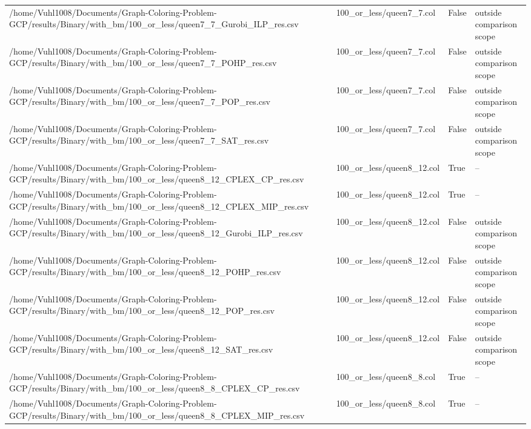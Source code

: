 \begin{table}[htbp]
\begin{tabular}{llll}
/home/Vuhl1008/Documents/Graph-Coloring-Problem-GCP/results/Binary/with\_bm/100\_or\_less/queen7\_7\_Gurobi\_ILP\_res.csv & 100\_or\_less/queen7\_7.col & False & outside comparison scope \\
/home/Vuhl1008/Documents/Graph-Coloring-Problem-GCP/results/Binary/with\_bm/100\_or\_less/queen7\_7\_POHP\_res.csv & 100\_or\_less/queen7\_7.col & False & outside comparison scope \\
/home/Vuhl1008/Documents/Graph-Coloring-Problem-GCP/results/Binary/with\_bm/100\_or\_less/queen7\_7\_POP\_res.csv & 100\_or\_less/queen7\_7.col & False & outside comparison scope \\
/home/Vuhl1008/Documents/Graph-Coloring-Problem-GCP/results/Binary/with\_bm/100\_or\_less/queen7\_7\_SAT\_res.csv & 100\_or\_less/queen7\_7.col & False & outside comparison scope \\
/home/Vuhl1008/Documents/Graph-Coloring-Problem-GCP/results/Binary/with\_bm/100\_or\_less/queen8\_12\_CPLEX\_CP\_res.csv & 100\_or\_less/queen8\_12.col & True & -- \\
/home/Vuhl1008/Documents/Graph-Coloring-Problem-GCP/results/Binary/with\_bm/100\_or\_less/queen8\_12\_CPLEX\_MIP\_res.csv & 100\_or\_less/queen8\_12.col & True & -- \\
/home/Vuhl1008/Documents/Graph-Coloring-Problem-GCP/results/Binary/with\_bm/100\_or\_less/queen8\_12\_Gurobi\_ILP\_res.csv & 100\_or\_less/queen8\_12.col & False & outside comparison scope \\
/home/Vuhl1008/Documents/Graph-Coloring-Problem-GCP/results/Binary/with\_bm/100\_or\_less/queen8\_12\_POHP\_res.csv & 100\_or\_less/queen8\_12.col & False & outside comparison scope \\
/home/Vuhl1008/Documents/Graph-Coloring-Problem-GCP/results/Binary/with\_bm/100\_or\_less/queen8\_12\_POP\_res.csv & 100\_or\_less/queen8\_12.col & False & outside comparison scope \\
/home/Vuhl1008/Documents/Graph-Coloring-Problem-GCP/results/Binary/with\_bm/100\_or\_less/queen8\_12\_SAT\_res.csv & 100\_or\_less/queen8\_12.col & False & outside comparison scope \\
/home/Vuhl1008/Documents/Graph-Coloring-Problem-GCP/results/Binary/with\_bm/100\_or\_less/queen8\_8\_CPLEX\_CP\_res.csv & 100\_or\_less/queen8\_8.col & True & -- \\
/home/Vuhl1008/Documents/Graph-Coloring-Problem-GCP/results/Binary/with\_bm/100\_or\_less/queen8\_8\_CPLEX\_MIP\_res.csv & 100\_or\_less/queen8\_8.col & True & -- \\

\end{tabular}
\end{table}
